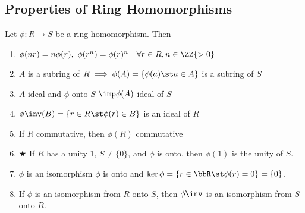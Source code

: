 \subsection{Properties of Ring Homomorphisms}
\begin{theorem}
  Let \( \phi: R\to S \) be a ring homomorphism. Then
  \begin{enumerate}
    \item \( \phi(nr) = n\phi(r),\  \phi(r^n) = \phi(r)^n \quad \forall r\in R, n\in \ZZ{>0} \)
    \item \( A \) is a subring of \( R \implies  \phi(A) = \{\phi(a) \st a\in A\} \) is a subring of \( S \)
    \item \( A \) ideal and \( \phi \) onto \( S \) \( \imp \phi(A) \) ideal of \( S \)
    \item \( \phi\inv(B) = \{r\in R \st \phi(r) \in B \} \) is an ideal of \( R \)
    \item If \( R \) commutative, then \( \phi(R) \) commutative
    \item \hspace{-2.75em}$\bigstar$\hspace{1.5em} If \( R \) has a unity 1, \( S\neq \{0\} \), and \( \phi \) is onto, then \( \phi(1) \) is the unity of \( S \).
    \item \( \phi \) is an isomorphism \iff \( \phi \) is onto and \( \ker\phi = \{r\in\bbR \st \phi(r) = 0\} = \{0\} \).
    \item If \( \phi \) is an isomorphism from \( R \) onto \( S \), then \( \phi\inv \) is an isomorphism from \( S \) onto \( R \).
  \end{enumerate}
\end{theorem}